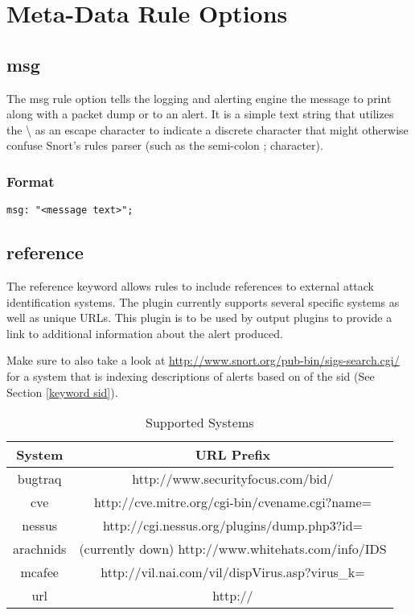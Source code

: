 \documentclass[english]{report}
\begin{document}
\section{Meta-Data Rule Options}

\subsection{msg}

The msg rule option tells the logging and alerting engine the message to print
along with a packet dump or to an alert. It is a simple text string that
utilizes the \textbackslash{} as an escape character to indicate a discrete
character that might otherwise confuse Snort's rules parser (such as the
semi-colon ; character).

\subsubsection{Format}

\begin{verbatim}
msg: "<message text>";
\end{verbatim}

\subsection{reference}

The reference keyword allows rules to include references to external
attack identification systems. The plugin currently supports several
specific systems as well as unique URLs. This plugin is to be used
by output plugins to provide a link to additional information about
the alert produced.

Make sure to also take a look at \url{http://www.snort.org/pub-bin/sigs-search.cgi/}
for a system that is indexing descriptions of alerts based on of
the sid (See Section \ref{keyword sid}).
\begin{table}[!hbpt]

\caption{Supported Systems \label{references systems}}

\begin{center}\begin{tabular}{|c|c|}
\hline 
System&
URL Prefix\\
\hline
\hline 
bugtraq&
http://www.securityfocus.com/bid/\\
\hline 
cve&
http://cve.mitre.org/cgi-bin/cvename.cgi?name=\\
\hline 
nessus &
http://cgi.nessus.org/plugins/dump.php3?id=\\
\hline 
arachnids&
(currently down) http://www.whitehats.com/info/IDS\\
\hline 
mcafee&
http://vil.nai.com/vil/dispVirus.asp?virus\_k=\\
\hline 
url&
http://\\
\hline
\end{tabular}\end{center}
\end{table}
\end{document}
